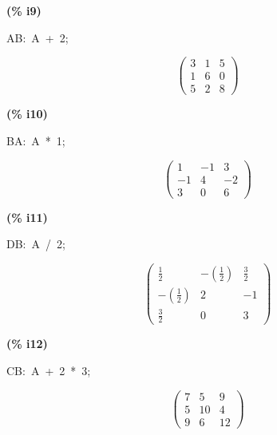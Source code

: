 \documentclass[fleqn]{article}
\begin{document}
\noindent
\begin{minipage}[t]{4.000000em}\color{red}\bfseries
(\% i9)	
\end{minipage}
\begin{minipage}[t]{\textwidth}\color{blue}
AB:\ A\ +\ 2;\\

\end{minipage}
\[\displaystyle \tag{AB} 
\begin{pmatrix}3 & 1 & 5\\
1 & 6 & 0\\
5 & 2 & 8\end{pmatrix}\mbox{}
\]


\noindent
\begin{minipage}[t]{4.000000em}\color{red}\bfseries
(\% i10)	
\end{minipage}
\begin{minipage}[t]{\textwidth}\color{blue}
BA:\ A\ *\ 1;
\end{minipage}
\[\displaystyle \tag{BA} 
\begin{pmatrix}1 & \mathop{-}1 & 3\\
\mathop{-}1 & 4 & \mathop{-}2\\
3 & 0 & 6\end{pmatrix}\mbox{}
\]


\noindent
\begin{minipage}[t]{4.000000em}\color{red}\bfseries
(\% i11)	
\end{minipage}
\begin{minipage}[t]{\textwidth}\color{blue}
DB:\ A\ /\ 2;\ 
\end{minipage}
\[\displaystyle \tag{DB} 
\begin{pmatrix}\frac{1}{2} & \mathop{-}\left( \frac{1}{2}\right)  & \frac{3}{2}\\
\mathop{-}\left( \frac{1}{2}\right)  & 2 & \mathop{-}1\\
\frac{3}{2} & 0 & 3\end{pmatrix}\mbox{}
\]


\noindent
\begin{minipage}[t]{4.000000em}\color{red}\bfseries
(\% i12)	
\end{minipage}
\begin{minipage}[t]{\textwidth}\color{blue}
CB:\ A\ +\ 2\ *\ 3;
\end{minipage}
\[\displaystyle \tag{CB} 
\begin{pmatrix}7 & 5 & 9\\
5 & 10 & 4\\
9 & 6 & 12\end{pmatrix}\mbox{}
\]
\end{document}
